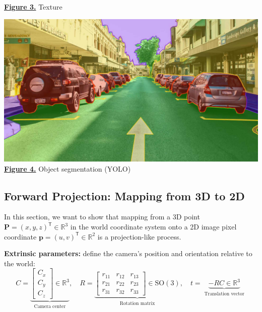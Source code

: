 \documentclass[12pt,a4paper]{article}
\theoremstyle{definition}
\newcommand{\R}{\mathbb{R}}
\newcommand{\vect}[1]{\bm{#1}}
\begin{document}
\begin{center}
\begin{minipage}{0.2\textwidth}
    \hyperlink{[Fig 3]}{\textbf{Figure 3.}} Texture
\end{minipage}
\hfill
\begin{minipage}{0.35\textwidth}
    \centering
    \includegraphics[width=\textwidth]{embedded_features.jpg} \\
    \hyperlink{[Fig 4]}{\textbf{Figure 4.}} Object segmentation (YOLO)
\end{minipage}
\end{center}

\vspace{-1em}

\subsection{Forward Projection: Mapping from 3D to 2D} \label{sec:forward_projection}
\vspace{-0.5em}
In this section, we want to show that mapping from a 3D point \(\vect{P} = (x,y,z)^\mathsf{T} \in \R^3\) in the world coordinate system onto a 2D image pixel coordinate \(\vect{p} = (u,v)^\mathsf{T} \in \R^2\) is a projection-like process.

\noindent\textbf{Extrinsic parameters:} define the camera's position and orientation relative to the world:
\vspace{-0.5em}
\begin{equation}
C = \underbrace{\begin{bmatrix} C_x \\ C_y \\ C_z \end{bmatrix} \in \R^3}_{\substack{\text{Camera center}}}, \quad
R = \underbrace{
\begin{bmatrix}
r_{11} & r_{12} & r_{13} \\
r_{21} & r_{22} & r_{23} \\
r_{31} & r_{32} & r_{33}
\end{bmatrix} \in \mathrm{SO}(3)
}_{\substack{\text{Rotation matrix}}}, \quad
t = \underbrace{-R C \in \R^3}_{\substack{\text{Translation vector}}}
\label{eq:extrinsic}
\end{equation}
\end{document}
